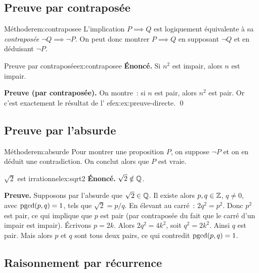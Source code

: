 \subsection{Preuve par contraposée}\label{subsec:contraposee}

\begin{remark}{Méthode}{rem:contraposee}
  L'implication $P\implies Q$ est logiquement équivalente à sa
  \emph{contraposée} $\lnot Q\implies\lnot P$. On peut donc montrer
  $P\implies Q$ en supposant $\lnot Q$ et en déduisant $\lnot P$.
\end{remark}

\begin{example}{Preuve par contraposée}{ex:contraposee}
  \textbf{Énoncé.} Si $n^2$ est impair, alors $n$ est impair.

  \textbf{Preuve (par contraposée).} On montre~: si $n$ est pair, alors
  $n^2$ est pair. Or c'est exactement le résultat de
  l'
ef{ex:ex:preuve-directe}. \qed
\end{example}

\subsection{Preuve par l'absurde}\label{subsec:absurde}

\begin{remark}{Méthode}{rem:absurde}
  Pour montrer une proposition $P$, on suppose $\lnot P$ et on en déduit
  une contradiction. On conclut alors que $P$ est vraie.
\end{remark}

\begin{example}{$\sqrt{2}$ est irrationnel}{ex:sqrt2}
  \textbf{Énoncé.} $\sqrt{2}\notin{\mathbb{Q}}$.

  \textbf{Preuve.} Supposons par l'absurde que $\sqrt{2}\in{\mathbb{Q}}$. Il
  existe alors $p,q\in{\mathbb{Z}}$, $q\neq 0$, avec $\operatorname{pgcd}(p,q)=1$, tels que
  $\sqrt{2}=p/q$. En élevant au carré~: $2q^2=p^2$. Donc $p^2$ est pair,
  ce qui implique que $p$ est pair (par contraposée du fait que le carré
  d'un impair est impair). Écrivons $p=2k$. Alors $2q^2=4k^2$, soit
  $q^2=2k^2$. Ainsi $q$ est pair. Mais alors $p$ et $q$ sont tous deux
  pairs, ce qui contredit $\operatorname{pgcd}(p,q)=1$.
\end{example}

\subsection{Raisonnement par récurrence}\label{subsec:recurrence}

